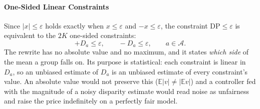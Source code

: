 \documentclass[conference]{IEEEtran}
\begin{document}
\paragraph*{One-Sided Linear Constraints}
Since $|x|\le\varepsilon$ holds exactly when $x\le\varepsilon$ and $-x\le\varepsilon$, the constraint $\mathrm{DP}\le\varepsilon$ is equivalent to the $2K$
one-sided constraints:
\begin{equation}
+D_a\le\varepsilon,\qquad -D_a\le\varepsilon,\qquad a\in\mathcal{A}.
\label{eq:onesided}
\end{equation}
The rewrite has no absolute value and no maximum, and it states \emph{which side} of the mean a group falls on. Its purpose is statistical: each constraint is
linear in $D_a$, so an unbiased estimate of $D_a$ is an unbiased estimate of every constraint's value. An absolute value would not preserve this 
($\mathbb{E}|v|\neq|\mathbb{E}v|$) and a controller fed with the magnitude of a noisy disparity estimate would read noise as unfairness and raise the price
indefinitely on a perfectly fair model.
\end{document}
